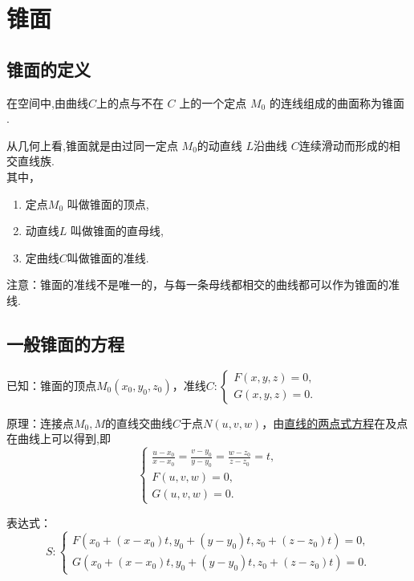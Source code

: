 \section{锥面} 
\subsection{锥面的定义}
\tdefination[锥面]
\par 在空间中,由曲线$C$上的点与不在 $C$ 上的一个定点 $M_0$ 的连线组成的曲面称为{\color{dy}锥面} .
\par 从几何上看,锥面就是由过同一定点 $M_0$的动直线 $L$沿曲线 $C$连续滑动而形成的{\color{dy}相交直线族}.\\
其中，
\sj
\begin{enumerate}[]
	\setlength{\itemindent}{2em}
	\setlength{\topsep}{0.01em}
	\setlength{\itemsep}{0.01em}
	\item 定点$M_0$ 叫做锥面的{\color{dy}顶点},
	\item 动直线$L$ 叫做锥面的{\color{dy}直母线},
	\item 定曲线$C$叫做锥面的{\color{dy}准线}.
\end{enumerate}
注意：锥面的准线不是唯一的，与每一条母线都相交的曲线都可以作为锥面的准线.

\subsection{一般锥面的方程}

\ttheorem[锥面的一般方程]

\par {\color{dy}已知}：锥面的顶点$M_0(x_0,y_0,z_0)$，准线$C:
\begin{cases}
F(x,y,z)=0,\\
G(x,y,z)=0.
\end{cases}$
\par {\color{dy}原理}：连接点$M_0,M$的直线交曲线$C$于点$N(u,v,w)$，由\hyperref[两点式方程]{\color{超链接}直线的两点式方程}在及点在曲线上可以得到,即
\begin{equation*}
\begin{cases}
\displaystyle \frac{u-x_0}{x-x_0}=\frac{v-y_0}{y-y_0}=\frac{w-z_0}{z-z_0}=t,\\
F(u,v,w)=0,\\
G(u,v,w)=0.
\end{cases}
\end{equation*}
\par {\color{dy}表达式}：
\begin{equation}
	S:
	\begin{cases}
	F(x_0+(x-x_0)t,y_0+(y-y_0)t,z_0+(z-z_0)t)=0,\\
	G(x_0+(x-x_0)t,y_0+(y-y_0)t,z_0+(z-z_0)t)=0.
	\end{cases}
\end{equation}

